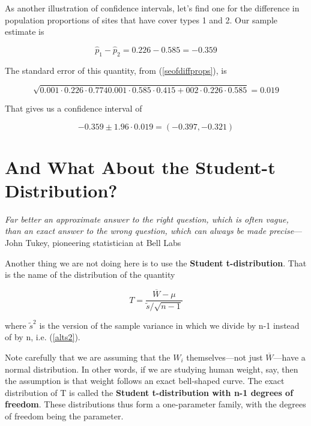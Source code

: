 As another illustration of confidence intervals, let's find one for the
difference in population proportions of sites that have cover types 1
and 2.  Our sample estimate is 

\begin{equation}
\widehat{p}_1 - \widehat{p}_2 = 0.226 - 0.585 = -0.359
\end{equation}

The standard error of this quantity, from (\ref{seofdiffprops}), is

\begin{equation}
\sqrt{
0.001 \cdot 0.226 \cdot 0.774
0.001 \cdot 0.585 \cdot 0.415
+002 \cdot 0.226 \cdot 0.585
} 
= 0.019
\end{equation}

That gives us a confidence interval of 

\begin{equation}
-0.359 \pm 1.96 \cdot 0.019 = (-0.397,-0.321)
\end{equation}

\section{And What About the Student-t Distribution?}
\label{studentt}

{\it Far better an approximate answer to the right question, which is
often vague, than an exact answer to the wrong question, which can
always be made precise}---John Tukey, pioneering statistician at Bell
Labs

Another thing we are not doing here is to use the {\bf Student
t-distribution}.  That is the name of the distribution of the quantity

\begin{equation}
\label{tdist}
T = \frac{\overline{W}-\mu}{\tilde{s}/\sqrt{n-1}}
\end{equation}

where $\tilde{s}^2$ is the version of the sample variance in which we
divide by n-1 instead of by n, i.e. (\ref{alts2}).

Note carefully that we are assuming that the $W_i$ themselves---not just
$\overline{W}$---have a normal distribution.  In other words, if we are
studying human weight, say, then the assumption is that weight follows
an exact bell-shaped curve.  The exact distribution of T is called the
{\bf Student t-distribution with n-1 degrees of freedom}.  These
distributions thus form a one-parameter family, with the degrees of
freedom being the parameter.


